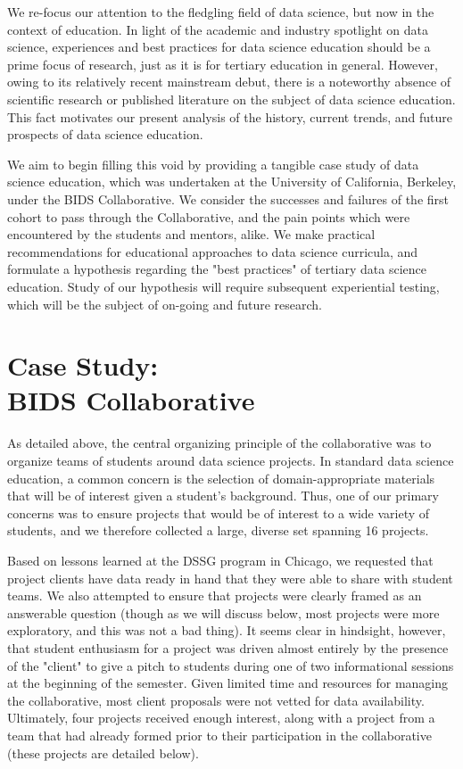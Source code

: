 \documentclass{sig-alternate}
\begin{document}
We re-focus our attention to the fledgling field of data science, but now in the context of education.  In light of the academic and industry spotlight on data science, experiences  and best practices for data science education should be a prime focus of research, just as it is for tertiary education in general.  However, owing to its relatively recent mainstream debut, there is a noteworthy absence of scientific research or published literature on the subject of data science education.  This fact motivates our present analysis of the history, current trends, and future prospects of data science education.

We aim to begin filling this void by providing a tangible case study of data science education, which was undertaken at the University of California, Berkeley, under the BIDS Collaborative. We consider the successes and failures of the first cohort to pass through the Collaborative, and the pain points which were encountered by the students and mentors, alike.  We make practical recommendations for educational approaches to data science curricula, and formulate a hypothesis regarding the "best practices" of tertiary data science education.  Study of our hypothesis will require subsequent experiential testing, which will be the subject of  on-going and future research.



\section{Case Study: \\BIDS Collaborative}

As detailed above, the central organizing principle of the collaborative was to organize teams of students around data science projects. In standard data science education, a common concern is the selection of domain-appropriate materials that will be of interest given a student's background. Thus, one of our primary concerns was to ensure projects that would be of interest to a wide variety of students, and we therefore collected a large, diverse set spanning 16 projects. 

Based on lessons learned at the DSSG program in Chicago, we requested that project clients have data ready in hand that they were able to share with student teams. We also attempted to ensure that projects were clearly framed as an answerable question (though as we will discuss below, most projects were more exploratory, and this was not a bad thing). It seems clear in hindsight, however, that student enthusiasm for a project was driven almost entirely by the presence of the "client" to give a pitch to students during one of two informational sessions at the beginning of the semester. Given limited time and resources for managing the collaborative, most client proposals were not vetted for data availability. Ultimately, four projects received enough interest, along with a project from a team that had already formed prior to their participation in the collaborative (these projects are detailed below).
\end{document}
